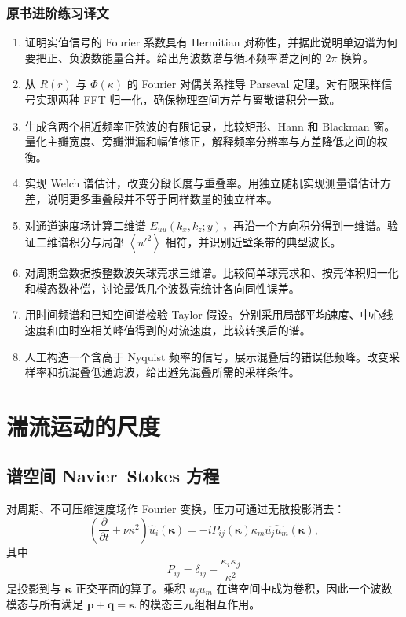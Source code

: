 \documentclass[12pt,a4paper,openany,fontset=none]{ctexbook}
\newcommand{\avg}[1]{\left\langle #1\right\rangle}
\begin{document}
\subsection*{原书进阶练习译文}
\begin{enumerate}[label=\arabic*.]
 \item 证明实值信号的 Fourier 系数具有 Hermitian 对称性，并据此说明单边谱为何要把正、负波数能量合并。给出角波数谱与循环频率谱之间的 $2\pi$ 换算。
 \item 从 $R(r)$ 与 $\Phi(\kappa)$ 的 Fourier 对偶关系推导 Parseval 定理。对有限采样信号实现两种 FFT 归一化，确保物理空间方差与离散谱积分一致。
 \item 生成含两个相近频率正弦波的有限记录，比较矩形、Hann 和 Blackman 窗。量化主瓣宽度、旁瓣泄漏和幅值修正，解释频率分辨率与方差降低之间的权衡。
 \item 实现 Welch 谱估计，改变分段长度与重叠率。用独立随机实现测量谱估计方差，说明更多重叠段并不等于同样数量的独立样本。
 \item 对通道速度场计算二维谱 $E_{uu}(k_x,k_z;y)$，再沿一个方向积分得到一维谱。验证二维谱积分与局部 $\avg{u'^2}$ 相符，并识别近壁条带的典型波长。
 \item 对周期盒数据按整数波矢球壳求三维谱。比较简单球壳求和、按壳体积归一化和模态数补偿，讨论最低几个波数壳统计各向同性误差。
 \item 用时间频谱和已知空间谱检验 Taylor 假设。分别采用局部平均速度、中心线速度和由时空相关峰值得到的对流速度，比较转换后的谱。
 \item 人工构造一个含高于 Nyquist 频率的信号，展示混叠后的错误低频峰。改变采样率和抗混叠低通滤波，给出避免混叠所需的采样条件。
\end{enumerate}
\chapter{湍流运动的尺度}

\section{谱空间 Navier--Stokes 方程}

对周期、不可压缩速度场作 Fourier 变换，压力可通过无散投影消去：
\begin{equation}
 \left(\frac{\partial}{\partial t}+\nu\kappa^2\right)\widehat u_i(\bm\kappa)
 =-iP_{ij}(\bm\kappa)\kappa_m
 \widehat{u_ju_m}(\bm\kappa),
\end{equation}
其中
\begin{equation}
 P_{ij}=\delta_{ij}-\frac{\kappa_i\kappa_j}{\kappa^2}
\end{equation}
是投影到与 $\bm\kappa$ 正交平面的算子。乘积 $u_ju_m$ 在谱空间中成为卷积，因此一个波数模态与所有满足 $\bm p+\bm q=\bm\kappa$ 的模态三元组相互作用。
\end{document}

